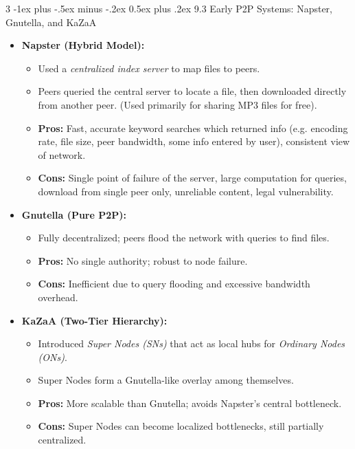 \documentclass[a4paper, 9pt, landscape]{article}
\makeatletter
\renewcommand{\subsection}{\@startsection{subsubsection}{3}{0mm}%
                                {-1ex plus -.5ex minus -.2ex}%
                                {0.5ex plus .2ex}%
                                {\normalfont\small\bfseries}}
\makeatother
\begin{document}
\begin{multicols*}{3}
\subsection{9.3 Early P2P Systems: Napster, Gnutella, and KaZaA}
\begin{itemize}
    \item \textbf{Napster (Hybrid Model):} 
    \begin{itemize}
        \item Used a \textit{centralized index server} to map files to peers.
        \item Peers queried the central server to locate a file, then downloaded directly from another peer. (Used primarily for sharing MP3 files for free).
        \item \textbf{Pros:} Fast, accurate keyword searches which returned info (e.g. encoding rate, file size, peer bandwidth, some info entered by user), consistent view of network.
        \item \textbf{Cons:} Single point of failure of the server, large computation for queries, download from single peer only, unreliable content, legal vulnerability.
    \end{itemize}
    \item \textbf{Gnutella (Pure P2P):}
    \begin{itemize}
        \item Fully decentralized; peers flood the network with queries to find files.
        \item \textbf{Pros:} No single authority; robust to node failure.
        \item \textbf{Cons:} Inefficient due to query flooding and excessive bandwidth overhead.
    \end{itemize}
    \item \textbf{KaZaA (Two-Tier Hierarchy):}
    \begin{itemize}
        \item Introduced \textit{Super Nodes (SNs)} that act as local hubs for \textit{Ordinary Nodes (ONs)}.
        \item Super Nodes form a Gnutella-like overlay among themselves.
        \item \textbf{Pros:} More scalable than Gnutella; avoids Napster’s central bottleneck.
        \item \textbf{Cons:} Super Nodes can become localized bottlenecks, still partially centralized.
    \end{itemize}
\end{itemize}


\end{multicols*}
\end{document}

